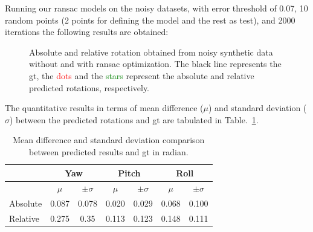 Running our ransac models on the noisy datasets, with error threshold of 0.07,
10 random points (2 points for defining the model and the rest as test), and
2000 iterations the following results are obtained:
\begin{figure}
  \centering
  \hfill
  \hspace*{\fill}
  \caption{Absolute and relative rotation obtained from  noisy synthetic data
    without and with ransac optimization. The black line represents the \gls{gt}, the
    \textcolor{red}{dots} and the \textcolor{green}{stars} represent the
    absolute and relative predicted rotations, respectively.}
  \label{fig:noisy-data}
\end{figure}

The quantitative results in terms of mean difference ($\mu$) and standard
deviation ($\sigma$)
between the predicted rotations and \gls{gt} are tabulated in
Table.~\ref{tab:tab1}.

\begin{table}
  \caption{Mean difference and standard deviation comparison between predicted
    results and \gls{gt} in radian.}
  \begin{tabular}{l cc cc cc}
    \toprule
    & \multicolumn{2}{c}{Yaw} & \multicolumn{2}{c}{Pitch} &
                                                            \multicolumn{2}{c}{Roll}\\
    \midrule
    & $\mu$ & $\pm \sigma$ &  $\mu$ & $\pm \sigma$ &  $\mu$ & $\pm \sigma$\\
    \cmidrule{2-3} \cmidrule{4-5} \cmidrule{6-7}

    Absolute & 0.087 & 0.078 & 0.020 & 0.029 & 0.068 & 0.100 \\
    Relative & 0.275 & 0.35 & 0.113 & 0.123 & 0.148 & 0.111\\
    \bottomrule
  \end{tabular}
  \label{tab:tab1}
\end{table}


